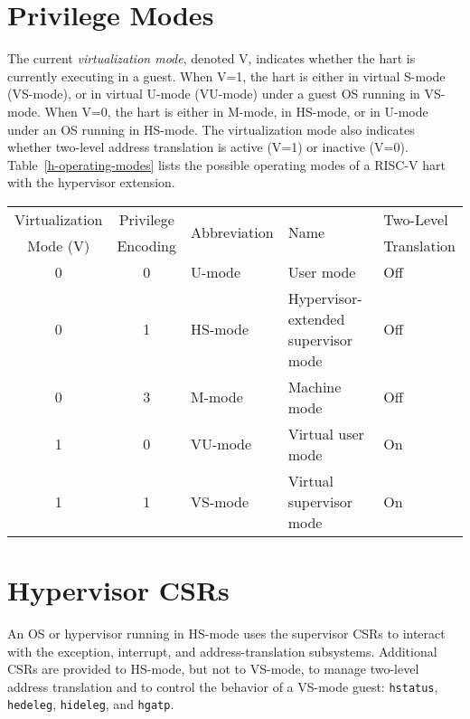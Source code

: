 \section{Privilege Modes}

The current {\em virtualization mode}, denoted V, indicates whether the hart
is currently executing in a guest.
When V=1, the hart is either in virtual S-mode (VS-mode), or in virtual U-mode
(VU-mode) under a guest OS running in VS-mode.
When V=0, the hart is either in M-mode, in HS-mode, or in U-mode under an OS
running in HS-mode.
The virtualization mode also indicates whether two-level address translation
is active (V=1) or inactive (V=0).  Table~\ref{h-operating-modes} lists the
possible operating modes of a RISC-V hart with the hypervisor extension.

\begin{table*}[h!]
\begin{center}
\begin{tabular}{|c|c||l|l|l|}
  \hline
   Virtualization & Privilege & \multirow{2}{*}{Abbreviation} & \multirow{2}{*}{Name} & Two-Level \\
   Mode (V)       & Encoding  &                               &                       & Translation \\ \hline
   0              & 0         & U-mode  & User mode & Off \\
   0              & 1         & HS-mode & Hypervisor-extended supervisor mode & Off \\
   0              & 3         & M-mode  & Machine mode & Off \\
  \hline
   1              & 0         & VU-mode & Virtual user mode & On \\
   1              & 1         & VS-mode & Virtual supervisor mode & On \\
  \hline
 \end{tabular}
\end{center}
\caption{Operating modes with the hypervisor extension.}
\label{h-operating-modes}
\end{table*}

\section{Hypervisor CSRs}

An OS or hypervisor running in HS-mode uses the supervisor CSRs to interact with the exception,
interrupt, and address-translation subsystems.
Additional CSRs are provided to HS-mode, but not to VS-mode, to manage
two-level address translation and to control the behavior of a VS-mode guest:
{\tt hstatus}, {\tt hedeleg}, {\tt hideleg}, and {\tt hgatp}.

